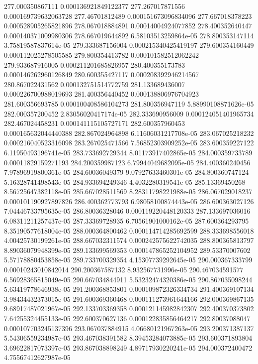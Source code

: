 {277.000350867111 0.000136921849122377
277.267017871556 0.000169739632063728
277.46701812489 0.000151673096834096
277.667018378223 0.000528905265821896
278.067018884891 0.00014004924077852
278.400352640447 0.000140371009980306
278.667019644892 6.58103513259864e-05
278.800353147114 3.75819587837614e-05
279.333687156004 0.000215340425419197
279.600354160449 0.000112025278505585
279.800354413782 0.000101582512062242
279.933687916005 0.000211201685826957
280.400355173783 0.000146262960126849
280.600355427117 0.000208392946214567
280.867022431562 0.000132751514772759
281.133689436007 0.000226700988019693
281.400356440452 0.000138806976704923
281.600356693785 0.000100408586104273
281.800356947119 5.88990108871626e-05
282.000357200452 2.83056020417174e-05
282.333690956009 0.000124051401965734
282.467024458231 0.000141115105727171
282.600357960453 0.000165632044440388
282.867024964898 6.11606031217708e-05
283.067025218232 0.000216040523316098
283.267025471566 7.56852303909252e-05
283.600359227122 6.11950493196741e-05
283.733692729344 8.01173917402865e-05
284.000359733789 0.00011829159271193
284.200359987123 6.79944049682095e-05
284.400360240456 7.97896919800361e-05
284.60036049379 9.07927633460301e-05
284.800360747124 5.16328741498543e-05
284.933694249346 4.4032280319541e-05
285.13369450268 8.56725647382118e-05
285.667028511569 8.28311798221988e-05
286.067029018237 0.000101190927897826
286.400362773793 6.98058100874443e-05
286.600363027126 7.04446733795635e-05
286.80036328046 0.000119220448120333
287.133697036016 6.08311211257437e-05
287.33369728935 6.70561901000162e-05
287.600364293795 8.35190577618004e-05
288.000364800462 0.000114714285692599
288.333698556018 4.00425730199261e-05
288.667032311574 0.000242575622742035
288.800365813797 8.89036079948399e-05
289.133699569353 0.000147865252104952
289.53370007602 5.57178880453858e-05
289.733700329354 4.15307739292645e-05
290.000367333799 0.00010243010842014
290.200367587132 8.932567731996e-05
290.467034591577 6.56928365815049e-05
290.667034844911 5.53232474320386e-05
290.867035098244 5.63419778646938e-05
291.200368853801 0.000109872326334734
291.400369107134 3.98434432373015e-05
291.600369360468 0.000111273961644166
292.000369867135 9.68917487021967e-05
292.133703369358 0.000121145982842307
292.400370373802 7.64255324455133e-05
292.600370627136 0.000122835856464217
292.80037088047 0.000107703245137396
293.067037884915 4.06680121967263e-05
293.200371387137 5.54306559234987e-05
293.467038391582 8.39453284073885e-05
293.600371893804 3.69622817073397e-05
293.867038898249 4.89717930220241e-05
294.000372400472 4.75567412627987e-05
}
